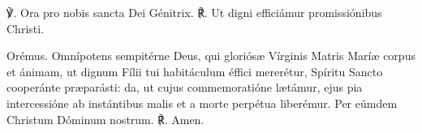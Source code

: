 
\vspace{2mm}
℣. Ora pro nobis sancta Dei Génitrix.
℟. Ut digni efficiámur promissiónibus Christi.

\vspace{3mm}
Orémus.
Omnípotens sempitérne Deus,
qui gloriósæ Vírginis Matris Maríæ corpus et ánimam,
ut dignum Fílii tui habitáculum éffici mererétur,
Spíritu Sancto cooperánte præparásti:
da, ut cujus commemoratióne lætámur,
ejus pia intercessióne ab instántibus malis et a morte perpétua liberémur.
Per eúmdem Christum Dóminum nostrum. 
℟. Amen.

